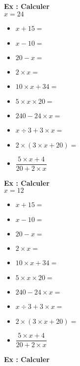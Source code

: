   \begin{multicols}{3}
    
    \textbf{Ex : Calculer} \\
    
    $x = 24$ 
    
    \begin{itemize}[label={$\bullet$}]
      \item $x + 15 = $ \dotfill
      \item $x - 10 = $ \dotfill
      \item $20 - x = $ \dotfill
      \item $2 \times x = $ \dotfill
      \item $10 \times x + 34 = $ \dotfill
      \item $5 \times  x \times 20 = $ \dotfill
      \item $240 - 24 \times x = $ \dotfill
      \item $x \div 3 + 3 \times x = $ \dotfill
      \item $2 \times (3  \times x + 20) = $ \dotfill
      \item $\dfrac{5 \times x + 4}{20 + 2 \times x}$ \dotfill
    \end{itemize} \columnbreak
    
    \textbf{Ex : Calculer} \\
    
    $x = 12$ 
    
    \begin{itemize}[label={$\bullet$}]
      \item $x + 15 = $ \dotfill
      \item $x - 10 = $ \dotfill
      \item $20 - x = $ \dotfill
      \item $2 \times x = $ \dotfill
      \item $10 \times x + 34 = $ \dotfill
      \item $5 \times  x \times 20 = $ \dotfill
      \item $240 - 24 \times x = $ \dotfill
      \item $x \div 3 + 3 \times x = $ \dotfill
      \item $2 \times (3  \times x + 20) = $ \dotfill
      \item $\dfrac{5 \times x + 4}{20 + 2 \times x}$ \dotfill
    \end{itemize} \columnbreak
    
    \textbf{Ex : Calculer} \\
    

\end{multicols}
